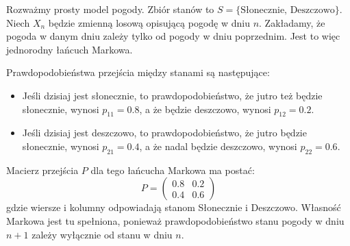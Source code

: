 \documentclass[final,a4paper,openany,12pt]{mwbk}
\begin{document}
\begin{Prz}
Rozważmy prosty model pogody. Zbiór stanów to $S = \{\text{Słonecznie, Deszczowo}\}$.
Niech $X_n$ będzie zmienną losową opisującą pogodę w dniu $n$. Zakładamy, że pogoda w danym dniu zależy tylko od pogody w dniu poprzednim. Jest to więc jednorodny łańcuch Markowa.

Prawdopodobieństwa przejścia między stanami są następujące:
\begin{itemize}
    \item Jeśli dzisiaj jest słonecznie, to prawdopodobieństwo, że jutro też będzie słonecznie, wynosi $p_{11} = 0.8$, a że będzie deszczowo, wynosi $p_{12} = 0.2$.
    \item Jeśli dzisiaj jest deszczowo, to prawdopodobieństwo, że jutro będzie słonecznie, wynosi $p_{21} = 0.4$, a że nadal będzie deszczowo, wynosi $p_{22} = 0.6$.
\end{itemize}
Macierz przejścia $P$ dla tego łańcucha Markowa ma postać:
\[
P = \begin{pmatrix}
0.8 & 0.2 \\
0.4 & 0.6
\end{pmatrix}
\]
gdzie wiersze i kolumny odpowiadają stanom Słonecznie i Deszczowo. Własność Markowa jest tu spełniona, ponieważ prawdopodobieństwo stanu pogody w dniu $n+1$ zależy wyłącznie od stanu w dniu $n$.
\end{Prz}





\printbibliography
\end{document}
